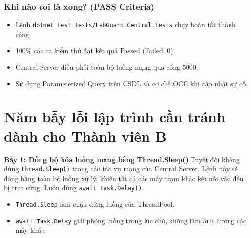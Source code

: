 \documentclass[12pt,a4paper]{article}
\begin{document}
\subsubsection{Khi nào coi là xong? (PASS Criteria)}
\begin{itemize}
  \item Lệnh \texttt{dotnet test tests/LabGuard.Central.Tests} chạy hoàn tất thành công.
  \item 100\% các ca kiểm thử đạt kết quả Passed (Failed: 0).
\end{itemize}

\begin{takeawaybox}
\begin{itemize}[leftmargin=1.5em, itemsep=1pt]
  \item Central Server điều phối toàn bộ luồng mạng qua cổng 5000.
  \item Sử dụng Parameterized Query trên CSDL và cơ chế OCC khi cập nhật sự cố.
\end{itemize}
\end{takeawaybox}

\section{Năm bẫy lỗi lập trình cần tránh dành cho Thành viên B}

\begin{pitfallbox}
\textbf{Bẫy 1: Đồng bộ hóa luồng mạng bằng Thread.Sleep()}
\newline Tuyệt đối không dùng \texttt{Thread.Sleep()} trong các tác vụ mạng của Central Server. Lệnh này sẽ đóng băng toàn bộ luồng xử lý, khiến tất cả các máy trạm khác kết nối vào đều bị treo cứng. Luôn dùng \texttt{await Task.Delay()}.
\end{pitfallbox}

\begin{orientationbox}
\begin{itemize}[leftmargin=1.5em, itemsep=1pt]
  \item \texttt{Thread.Sleep} làm chặn đứng luồng của ThreadPool.
  \item \texttt{await Task.Delay} giải phóng luồng trong lúc chờ, không làm ảnh hưởng các máy khác.
\end{itemize}
\end{orientationbox}
\end{document}

